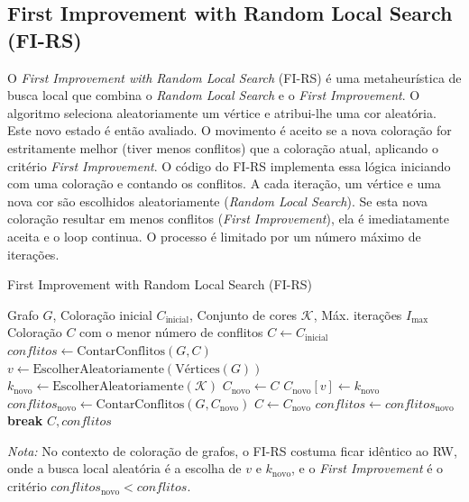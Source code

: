 \documentclass[12pt,a4paper]{article}
\begin{document}
\subsection{First Improvement with Random Local Search (FI-RS)}
O \textit{First Improvement with Random Local Search} (FI-RS) é uma metaheurística de busca local que combina o \textit{Random Local Search} e o \textit{First Improvement}. O algoritmo seleciona aleatoriamente um vértice e atribui-lhe uma cor aleatória. Este novo estado é então avaliado. O movimento é aceito se a nova coloração for estritamente melhor (tiver menos conflitos) que a coloração atual, aplicando o critério \textit{First Improvement}.
O código do FI-RS implementa essa lógica iniciando com uma coloração e contando os conflitos. A cada iteração, um vértice e uma nova cor são escolhidos aleatoriamente (\textit{Random Local Search}). Se esta nova coloração resultar em menos conflitos (\textit{First Improvement}), ela é imediatamente aceita e o loop continua. O processo é limitado por um número máximo de iterações.
\begin{algorithm}[H]
\caption{First Improvement with Random Local Search (FI-RS)}
\label{alg:fi_rs}
\begin{algorithmic}[1]
\Require Grafo \(G\), Coloração inicial \(C_{\text{inicial}}\), Conjunto de cores \(\mathcal{K}\), Máx. iterações \(I_{\max}\)
\Ensure Coloração \(C\) com o menor número de conflitos
\State \(C \gets C_{\text{inicial}}\)
\State \(conflitos \gets \text{ContarConflitos}(G, C)\)
    \State \(v \gets \text{EscolherAleatoriamente}(\text{Vértices}(G))\)
    \State \(k_{\text{novo}} \gets \text{EscolherAleatoriamente}(\mathcal{K})\)
    \State \(C_{\text{novo}} \gets C\)
    \State \(C_{\text{novo}}[v] \gets k_{\text{novo}}\)
    \State \(conflitos_{\text{novo}} \gets \text{ContarConflitos}(G, C_{\text{novo}})\)
        \State \(C \gets C_{\text{novo}}\)
        \State \(conflitos \gets conflitos_{\text{novo}}\)
         \State \textbf{break} \EndIf
    \EndIf
\EndFor
\State \Return \(C, conflitos\)
\end{algorithmic}
\end{algorithm}

\noindent\textit{Nota:} No contexto de coloração de grafos, o FI-RS costuma ficar idêntico ao RW, onde a busca local aleatória é a escolha de \(v\) e \(k_{\text{novo}}\), e o \textit{First Improvement} é o critério \(conflitos_{\text{novo}} < conflitos\).
\end{document}
